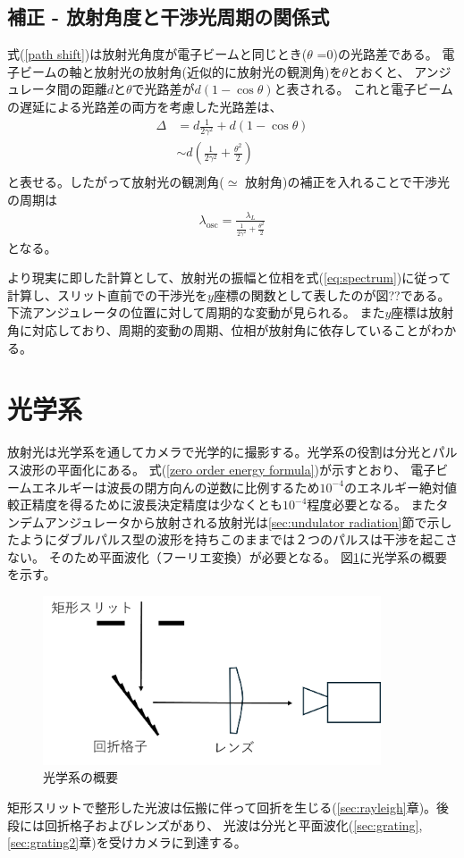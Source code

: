 \documentclass[a4paper,11pt,uplatex]{jsbook}
\begin{document}
\subsection{補正 - 放射角度と干渉光周期の関係式}
式(\ref*{path shift})は放射光角度が電子ビームと同じとき($\theta$ =0)の光路差である。
電子ビームの軸と放射光の放射角(近似的に放射光の観測角)を$\theta$とおくと、
アンジュレータ間の距離$d$と$\theta$で光路差が$d(1-\cos{\theta})$と表される。
これと電子ビームの遅延による光路差の両方を考慮した光路差は、
\begin{eqnarray}
  \Delta &= d\frac{1}{2\gamma^2} + d(1 - \cos{\theta}) \\
        &\sim d(\frac{1}{2\gamma^2} + \frac{\theta^2}{2})\\
\end{eqnarray}
と表せる。したがって放射光の観測角($\simeq$ 放射角)の補正を入れることで干渉光の周期は
\begin{eqnarray}
  \lambda_{\text{osc}} = \frac{\lambda_L}{\frac{1}{2\gamma^2} + \frac{\theta^2}{2}}
\end{eqnarray}
となる。

より現実に即した計算として、放射光の振幅と位相を式(\ref{eq:spectrum})に従って計算し、スリット直前での干渉光を$y$座標の関数として表したのが図??である。
下流アンジュレータの位置に対して周期的な変動が見られる。
また$y$座標は放射角に対応しており、周期的変動の周期、位相が放射角に依存していることがわかる。


\section{光学系}\label{sec:optics}
放射光は光学系を通してカメラで光学的に撮影する。光学系の役割は分光とパルス波形の平面化にある。
式(\ref{zero order energy formula})が示すとおり、
電子ビームエネルギーは波長の閉方向んの逆数に比例するため$10^{-4}$のエネルギー絶対値較正精度を得るために波長決定精度は少なくとも$10^{-4}$程度必要となる。
またタンデムアンジュレータから放射される放射光は\ref{sec:undulator radiation}節で示したようにダブルパルス型の波形を持ちこのままでは２つのパルスは干渉を起こさない。
そのため平面波化（フーリエ変換）が必要となる。
図\ref{optics_schematic}に光学系の概要を示す。
\begin{figure}[h]
  \centering
  \includegraphics[width=10cm]{image/2-opticsshematic.png}
  \caption{光学系の概要}
  \label{optics_schematic}
\end{figure}
矩形スリットで整形した光波は伝搬に伴って回折を生じる(\ref{sec:rayleigh}章)。後段には回折格子およびレンズがあり、
光波は分光と平面波化(\ref{sec:grating},\ref{sec:grating2}章)を受けカメラに到達する。
\end{document}
